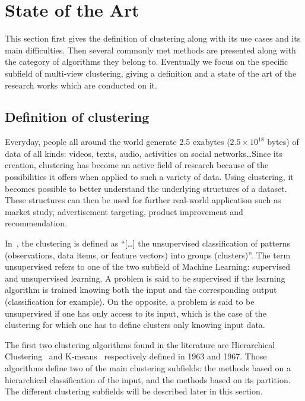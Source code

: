 %
\chapter{State of the Art}
This section first gives the definition of clustering along with its use cases and its main difficulties. Then several commonly met methods are presented along with the category of algorithms they belong to. Eventually we focus on the specific subfield of multi-view clustering, giving a definition and a state of the art of the research works which are conducted on it.

    \section{Definition of clustering}
    Everyday, people all around the world generate 2.5 exabytes ($2.5 \times 10^{18}$ bytes) of data of all kinds: videos, texts, audio, activities on social networks\ldots Since its creation, clustering has become an active field of research because of the possibilities it offers when applied to such a variety of data. Using clustering, it becomes possible to better understand the underlying structures of a dataset. These structures can then be used for further real-world application such as market study, advertisement targeting, product improvement and recommendation.

    In~\cite{jain1999data}, the clustering is defined as ``[\ldots] the unsupervised classification of patterns (observations, data items, or feature vectors) into groups (clusters)''. The term unsupervised refers to one of the two subfield of Machine Learning: supervised and unsupervised learning. A problem is said to be supervised if the learning algorithm is trained knowing both the input and the corresponding output (classification for example). On the opposite, a problem is said to be unsupervised if one has only access to its input, which is the case of the clustering for which one has to define clusters only knowing input data.  

    The first two clustering algorithms found in the literature are Hierarchical Clustering~\cite{ward1963hierarchical} and K-means~\cite{macqueen1967some} respectively defined in 1963 and 1967. Those algorithms define two of the main clustering subfields: the methods based on a hierarchical classification of the input, and the methods based on its partition. The different clustering subfields will be described later in this section.

